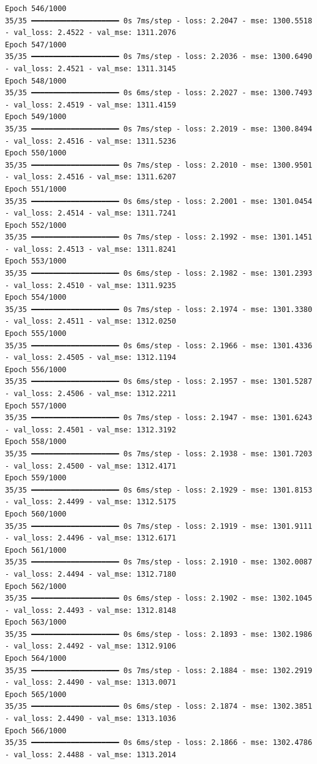 \documentclass[
  letterpaper,
  DIV=11,
  numbers=noendperiod]{scrreprt}
\begin{document}
\begin{verbatim}
Epoch 546/1000
35/35 ━━━━━━━━━━━━━━━━━━━━ 0s 7ms/step - loss: 2.2047 - mse: 1300.5518 - val_loss: 2.4522 - val_mse: 1311.2076
Epoch 547/1000
35/35 ━━━━━━━━━━━━━━━━━━━━ 0s 7ms/step - loss: 2.2036 - mse: 1300.6490 - val_loss: 2.4521 - val_mse: 1311.3145
Epoch 548/1000
35/35 ━━━━━━━━━━━━━━━━━━━━ 0s 6ms/step - loss: 2.2027 - mse: 1300.7493 - val_loss: 2.4519 - val_mse: 1311.4159
Epoch 549/1000
35/35 ━━━━━━━━━━━━━━━━━━━━ 0s 7ms/step - loss: 2.2019 - mse: 1300.8494 - val_loss: 2.4516 - val_mse: 1311.5236
Epoch 550/1000
35/35 ━━━━━━━━━━━━━━━━━━━━ 0s 7ms/step - loss: 2.2010 - mse: 1300.9501 - val_loss: 2.4516 - val_mse: 1311.6207
Epoch 551/1000
35/35 ━━━━━━━━━━━━━━━━━━━━ 0s 6ms/step - loss: 2.2001 - mse: 1301.0454 - val_loss: 2.4514 - val_mse: 1311.7241
Epoch 552/1000
35/35 ━━━━━━━━━━━━━━━━━━━━ 0s 7ms/step - loss: 2.1992 - mse: 1301.1451 - val_loss: 2.4513 - val_mse: 1311.8241
Epoch 553/1000
35/35 ━━━━━━━━━━━━━━━━━━━━ 0s 6ms/step - loss: 2.1982 - mse: 1301.2393 - val_loss: 2.4510 - val_mse: 1311.9235
Epoch 554/1000
35/35 ━━━━━━━━━━━━━━━━━━━━ 0s 7ms/step - loss: 2.1974 - mse: 1301.3380 - val_loss: 2.4511 - val_mse: 1312.0250
Epoch 555/1000
35/35 ━━━━━━━━━━━━━━━━━━━━ 0s 6ms/step - loss: 2.1966 - mse: 1301.4336 - val_loss: 2.4505 - val_mse: 1312.1194
Epoch 556/1000
35/35 ━━━━━━━━━━━━━━━━━━━━ 0s 6ms/step - loss: 2.1957 - mse: 1301.5287 - val_loss: 2.4506 - val_mse: 1312.2211
Epoch 557/1000
35/35 ━━━━━━━━━━━━━━━━━━━━ 0s 7ms/step - loss: 2.1947 - mse: 1301.6243 - val_loss: 2.4501 - val_mse: 1312.3192
Epoch 558/1000
35/35 ━━━━━━━━━━━━━━━━━━━━ 0s 7ms/step - loss: 2.1938 - mse: 1301.7203 - val_loss: 2.4500 - val_mse: 1312.4171
Epoch 559/1000
35/35 ━━━━━━━━━━━━━━━━━━━━ 0s 6ms/step - loss: 2.1929 - mse: 1301.8153 - val_loss: 2.4499 - val_mse: 1312.5175
Epoch 560/1000
35/35 ━━━━━━━━━━━━━━━━━━━━ 0s 7ms/step - loss: 2.1919 - mse: 1301.9111 - val_loss: 2.4496 - val_mse: 1312.6171
Epoch 561/1000
35/35 ━━━━━━━━━━━━━━━━━━━━ 0s 7ms/step - loss: 2.1910 - mse: 1302.0087 - val_loss: 2.4494 - val_mse: 1312.7180
Epoch 562/1000
35/35 ━━━━━━━━━━━━━━━━━━━━ 0s 6ms/step - loss: 2.1902 - mse: 1302.1045 - val_loss: 2.4493 - val_mse: 1312.8148
Epoch 563/1000
35/35 ━━━━━━━━━━━━━━━━━━━━ 0s 6ms/step - loss: 2.1893 - mse: 1302.1986 - val_loss: 2.4492 - val_mse: 1312.9106
Epoch 564/1000
35/35 ━━━━━━━━━━━━━━━━━━━━ 0s 7ms/step - loss: 2.1884 - mse: 1302.2919 - val_loss: 2.4490 - val_mse: 1313.0071
Epoch 565/1000
35/35 ━━━━━━━━━━━━━━━━━━━━ 0s 6ms/step - loss: 2.1874 - mse: 1302.3851 - val_loss: 2.4490 - val_mse: 1313.1036
Epoch 566/1000
35/35 ━━━━━━━━━━━━━━━━━━━━ 0s 6ms/step - loss: 2.1866 - mse: 1302.4786 - val_loss: 2.4488 - val_mse: 1313.2014

\end{verbatim}
\end{document}
